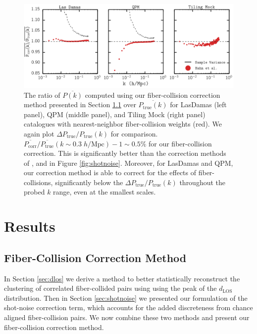 \documentclass{emulateapj}
\begin{document}
\begin{figure}
\begin{center}
\includegraphics[scale=0.55]{fcpaper_pk_peakshotnoise_mpfit_comp.png} 
\caption{The ratio of $\overline{P(k)}$ computed using our fiber-collision correction method presented in Section \ref{sec:apply} over $\overline{P_\mathrm{true}(k)}$ for LasDamas (left panel), QPM (middle panel), and Tiling Mock (right panel) catalogues with nearest-neighbor fiber-collision weights (red). We again plot $\Delta P_\mathrm{true}/P_\mathrm{true}(k)$ for comparison. $\overline{P_\mathrm{corr}}/\overline{P_\mathrm{true}}(k \sim 0.3 \; h/\mathrm{Mpc})-1 \sim 0.5\%$ for our fiber-collision correction. This is significantly better than the correction methods of \cite{Anderson:2012aa}, \cite{Beutler:2014aa} and \cite{Gil-Marin:2014aa} in Figure \ref{fig:shotnoise}. Moreover, for LasDamas and QPM, our correction method is able to correct for the effects of fiber-collisions, significantly below the $\Delta P_\mathrm{true}/P_\mathrm{true}(k)$ throughout the probed $k$ range, even at the smallest scales. }\label{fig:peaksn}
\end{center}
\end{figure}
\section{Results} \label{sec:results}
\subsection{Fiber-Collision Correction Method} \label{sec:apply}
In Section \ref{sec:dlos} we derive a method to better statistically reconstruct the clustering of correlated fiber-collided pairs using using the peak of the $d_\mathrm{LOS}$ distribution. Then in Section \ref{sec:shotnoise} we presented our formulation of the shot-noise correction term, which accounts for the added discreteness from chance aligned fiber-collision pairs. We now combine these two methods and present our fiber-collision correction method. 
\end{document}
